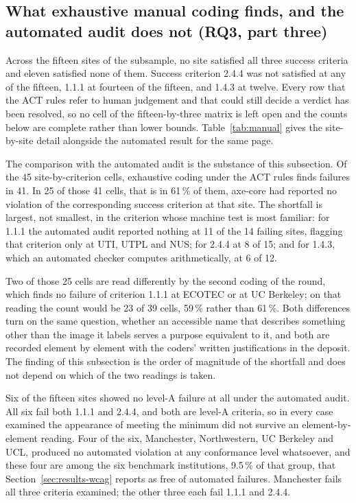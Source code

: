 \documentclass[pdflatex,sn-basic,Numbered,iicol]{sn-jnl}
\theoremstyle{thmstyleone}
\theoremstyle{thmstyletwo}
\theoremstyle{thmstylethree}
\begin{document}
\subsection{What exhaustive manual coding finds, and the automated audit does not (RQ3, part three)}\label{sec:results-manual}

Across the fifteen sites of the subsample, no site satisfied all three success criteria and eleven satisfied none of them. Success criterion 2.4.4 was not satisfied at any of the fifteen, 1.1.1 at fourteen of the fifteen, and 1.4.3 at twelve. Every row that the ACT rules refer to human judgement and that could still decide a verdict has been resolved, so no cell of the fifteen-by-three matrix is left open and the counts below are complete rather than lower bounds. Table~\ref{tab:manual} gives the site-by-site detail alongside the automated result for the same page.

The comparison with the automated audit is the substance of this subsection. Of the 45 site-by-criterion cells, exhaustive coding under the ACT rules finds failures in 41. In 25 of those 41 cells, that is in 61\,\% of them, axe-core had reported no violation of the corresponding success criterion at that site. The shortfall is largest, not smallest, in the criterion whose machine test is most familiar: for 1.1.1 the automated audit reported nothing at 11 of the 14 failing sites, flagging that criterion only at UTI, UTPL and NUS; for 2.4.4 at 8 of 15; and for 1.4.3, which an automated checker computes arithmetically, at 6 of 12.

Two of those 25 cells are read differently by the second coding of the round, which finds no failure of criterion 1.1.1 at ECOTEC or at UC Berkeley; on that reading the count would be 23 of 39 cells, 59\,\% rather than 61\,\%. Both differences turn on the same question, whether an accessible name that describes something other than the image it labels serves a purpose equivalent to it, and both are recorded element by element with the coders' written justifications in the deposit. The finding of this subsection is the order of magnitude of the shortfall and does not depend on which of the two readings is taken.

Six of the fifteen sites showed no level-A failure at all under the automated audit. All six fail both 1.1.1 and 2.4.4, and both are level-A criteria, so in every case examined the appearance of meeting the minimum did not survive an element-by-element reading. Four of the six, Manchester, Northwestern, UC Berkeley and UCL, produced no automated violation at any conformance level whatsoever, and these four are among the six benchmark institutions, 9.5\,\% of that group, that Section~\ref{sec:results-wcag} reports as free of automated failures. Manchester fails all three criteria examined; the other three each fail 1.1.1 and 2.4.4.
\end{document}
